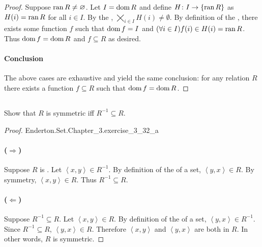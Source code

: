 \documentclass{report}
\newcommand{\pair}[1]{\left< #1 \right>}
\begin{document}
\begin{proof}
      Suppose $\mathop{\text{ran}}{R} \neq \varnothing$.
      Let $I = \mathop{\text{dom}}{R}$ and define $H \colon I \rightarrow \{\mathop{\text{ran}}{R}\}$ as
        $H(i) = \mathop{\text{ran}}{R}$ for all $i \in I$.
      By the ,
        $\bigtimes_{i \in I} H(i) \neq \emptyset$.
      By definition of the , there exists some
        function $f$ such that $\mathop{\text{dom}}{f} = I$ and
        $(\forall i \in I) f(i) \in H(i) = \mathop{\text{ran}}{R}$.
      Thus $\mathop{\text{dom}}{f} = \mathop{\text{dom}}{R}$ and $f \subseteq R$ as desired.

    \paragraph{Conclusion}%

      The above cases are exhaustive and yield the same conclusion: for any
        relation $R$ there exists a function $f \subseteq R$ such that
        $\mathop{\text{dom}}{f} = \mathop{\text{dom}}{R}$.

\end{proof}

\subsection{}%

Show that $R$ is symmetric iff $R^{-1} \subseteq R$.

\begin{proof}

    {Enderton.Set.Chapter\_3.exercise\_3\_32\_a}

  \paragraph{($\Rightarrow$)}%

    Suppose $R$ is .
    Let $\pair{x, y} \in R^{-1}$.
    By definition of the  of a set,
      $\pair{y, x} \in R$.
    By symmetry, $\pair{x, y} \in R$.
    Thus $R^{-1} \subseteq R$.

  \paragraph{($\Leftarrow$)}%

    Suppose $R^{-1} \subseteq R$.
    Let $\pair{x, y} \in R$.
    By definition of the  of a set,
      $\pair{y, x} \in R^{-1}$.
    Since $R^{-1} \subseteq R$, $\pair{y, x} \in R$.
    Therefore $\pair{x, y}$ and $\pair{y, x}$ are both in $R$.
    In other words, $R$ is symmetric.

\end{proof}
\end{document}
